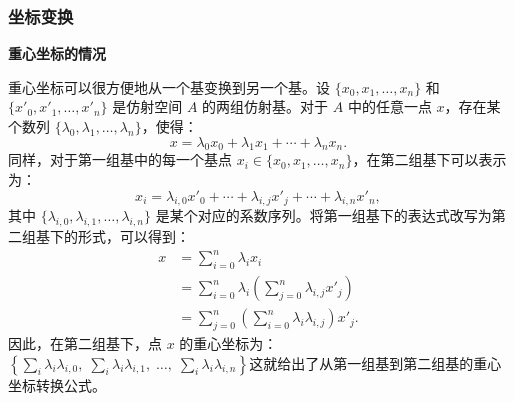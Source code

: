 \subsubsection{坐标变换}
\textbf{重心坐标的情况}

重心坐标可以很方便地从一个基变换到另一个基。设 $\{x_0, x_1, \dots, x_n\}$ 和 $\{x'_0, x'_1, \dots, x'_n\}$ 是仿射空间 $A$ 的两组仿射基。对于 $A$ 中的任意一点 $x$，存在某个数列 $\{\lambda_0, \lambda_1, \dots, \lambda_n\}$，使得：
$$
x = \lambda_0 x_0 + \lambda_1 x_1 + \cdots + \lambda_n x_n.~
$$
同样，对于第一组基中的每一个基点 $x_i \in \{x_0, x_1, \dots, x_n\}$，在第二组基下可以表示为：
$$
x_i = \lambda_{i,0} x'_0 + \cdots + \lambda_{i,j} x'_j + \cdots + \lambda_{i,n} x'_n,~
$$
其中 $\{\lambda_{i,0}, \lambda_{i,1}, \dots, \lambda_{i,n}\}$ 是某个对应的系数序列。将第一组基下的表达式改写为第二组基下的形式，可以得到：
$$
\begin{aligned}
x &= \sum_{i=0}^n \lambda_i x_i \\[6pt]
  &= \sum_{i=0}^n \lambda_i \left( \sum_{j=0}^n \lambda_{i,j} x'_j \right) \\[6pt]
  &= \sum_{j=0}^n \left( \sum_{i=0}^n \lambda_i \lambda_{i,j} \right) x'_j.
\end{aligned}~
$$
因此，在第二组基下，点 $x$ 的重心坐标为：$\left\{\sum_i \lambda_i \lambda_{i,0},\;\sum_i \lambda_i \lambda_{i,1},\;\dots,\;
\sum_i \lambda_i \lambda_{i,n}\right\}$这就给出了从第一组基到第二组基的重心坐标转换公式。
